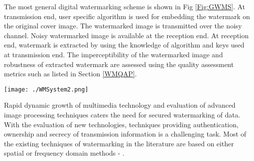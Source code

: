 	The most general digital watermarking scheme is shown in Fig \ref{Fig:GWMS}. At transmission end, user specific algorithm is used for embedding the watermark on the original cover image. The watermarked image is transmitted over the noisy channel. Noisy watermarked image is available at the reception end. At reception end, watermark is extracted by using the knowledge of algorithm and keys used at transmission end. The imperceptibility of the watermarked image and robustness of extracted watermark are assessed using the quality assessment metrics such as listed in Section \ref{WMQAP}.\\

 \begin{figure*}
 \centering
 \texttt{[image: ./WMSystem2.png]}
 \caption{General Watermarking System.}
 \label{Fig:GWMS}
\end{figure*}

Rapid dynamic growth of multimedia technology and evaluation of advanced image processing techniques caters the need for secured watermarking of data. With the evaluation of new technologies, techniques providing authentication, ownership and secrecy of transmission information is a challenging task. Most of the existing techniques of watermarking in the literature are based on either spatial or frequency domain methods \cite{P4}- \cite{P22}. \\

